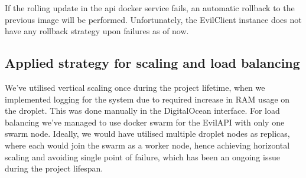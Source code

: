 \documentclass[report/main.tex]{subfiles}
\begin{document}
\begin{enumerate}
                    If the rolling update in the api docker service fails, an automatic rollback to the previous image will be performed. Unfortunately, the EvilClient instance does not have any rollback strategy upon failures as of now.  
                    
                \end{enumerate}
        
        \subsection{Applied strategy for scaling and load balancing}
            We've utilised vertical scaling once during the project lifetime, when we implemented logging for the system due to required increase in RAM usage on the droplet. This was done manually in the DigitalOcean interface. For load balancing we've managed to use docker swarm for the EvilAPI with only one swarm node. Ideally, we would have utilised multiple droplet nodes as replicas, where each would join the swarm as a worker node, hence achieving horizontal scaling and avoiding single point of failure, which has been an ongoing issue during the project lifespan.  
        
\end{document}
